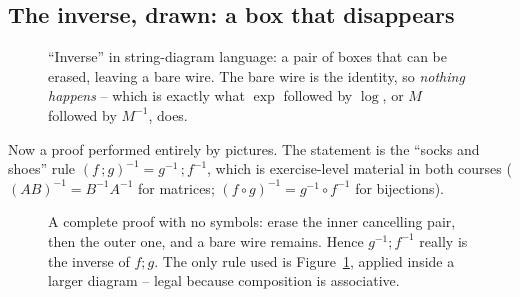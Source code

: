 \subsection{The inverse, drawn: a box that disappears}

\begin{figure}[H]
\centering
{}
\caption{``Inverse'' in string-diagram language: a pair of boxes that can be erased,
leaving a bare wire. The bare wire is the identity, so \emph{nothing happens} -- which is
exactly what $\exp$ followed by $\log$, or $M$ followed by $M^{-1}$, does.}
\label{fig:strinv}
\end{figure}

Now a proof performed entirely by pictures. The statement is the ``socks and shoes''
rule $(f\,;g)^{-1}=g^{-1}\,;f^{-1}$, which is exercise-level material in both courses
($(AB)^{-1}=B^{-1}A^{-1}$ for matrices; $(f\circ g)^{-1}=g^{-1}\circ f^{-1}$ for
bijections).

\begin{figure}[H]
\centering
{}
\caption{A complete proof with no symbols: erase the inner cancelling pair, then the
outer one, and a bare wire remains. Hence $g^{-1};f^{-1}$ really is the inverse of
$f;g$. The only rule used is Figure~\ref{fig:strinv}, applied inside a larger diagram --
legal because composition is associative.}
\label{fig:socks}
\end{figure}

